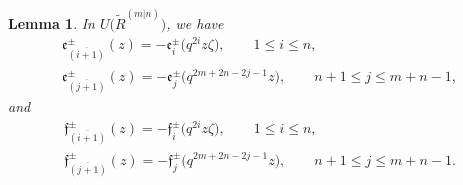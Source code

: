 \documentclass[10pt,a4paper]{amsart}
\numberwithin{equation}{section}
\newtheorem{Lemma}[Theorem]{Lemma}
\begin{document}
\begin{Lemma}\label{le4}In
$U\bigl(\widetilde{R}^{(m|n)}\bigr)$, we have
\begin{gather}\label{For5}
 \mathfrak{e}^{\pm}_{\overline{(i+1)}}(z)=-\mathfrak{e}^{\pm}_{i}\bigl(q^{2i}z\zeta\bigr), \qquad 1\leq i\leq n,\\
 \label{For6}
 \mathfrak{e}^{\pm}_{\overline{(j+1)}}(z)=-\mathfrak{e}^{\pm}_{j}\bigl(q^{2m+2n-2j-1}z\bigr), \qquad n+1\leq j\leq m+n-1,
\end{gather}
and
\begin{gather}\label{For7}
 \mathfrak{f}^{\pm}_{\overline{(i+1)}}(z)=-\mathfrak{f}^{\pm}_{i}\bigl(q^{2i}z\zeta\bigr), \qquad 1\leq i\leq n,\\
 \label{For8}
 \mathfrak{f}^{\pm}_{\overline{(j+1)}}(z)=-\mathfrak{f}^{\pm}_{j}\bigl(q^{2m+2n-2j-1}z\bigr), \qquad n+1\leq j\leq m+n-1.
\end{gather}
\end{Lemma}
\end{document}
